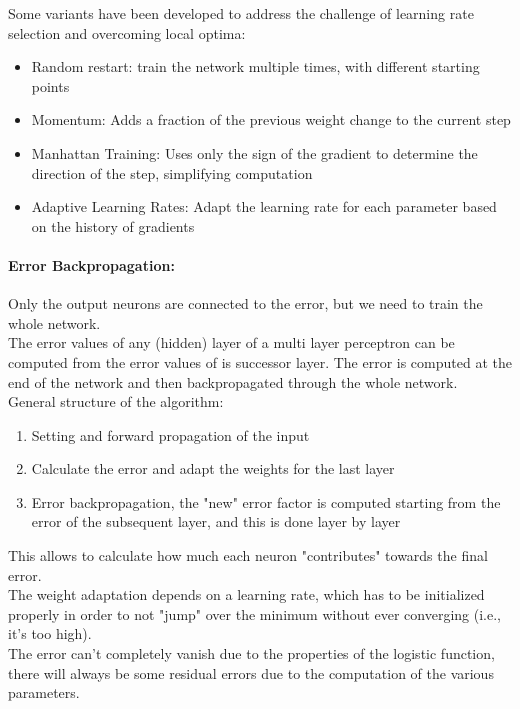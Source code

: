 \documentclass{article}
\begin{document}
	Some variants have been developed to address the challenge of learning rate selection and overcoming local optima:
	\begin{itemize}
		\item Random restart: train the network multiple times, with different starting points
		\item Momentum: Adds a fraction of the previous weight change to the current step
		\item Manhattan Training: Uses only the sign of the gradient to determine the direction of the step, simplifying computation
		\item Adaptive Learning Rates: Adapt the learning rate for each parameter based on the history of gradients
	\end{itemize}
	
	\paragraph{Error Backpropagation:} Only the output neurons are connected to the error, but we need to train the whole network. \\
	The error values of any (hidden) layer of a multi layer perceptron can be computed from the error values of is successor layer. The error is computed at the end of the network and then backpropagated through the whole network.\\
	General structure of the algorithm:
	\begin{enumerate}
		\item Setting and forward propagation of the input
		\item Calculate the error and adapt the weights for the last layer
		\item Error backpropagation, the "new" error factor is computed starting from the error of the subsequent layer, and this is done layer by layer
	\end{enumerate}
	This allows to calculate how much each neuron "contributes" towards the final error.\\
	
	The weight adaptation depends on a learning rate, which has to be initialized properly in order to not "jump" over the minimum without ever converging (i.e., it's too high).\\
	
	The error can’t completely vanish due to the properties of the logistic function, there will always be some residual errors due to the computation of the various parameters.\\
	
\end{document}
